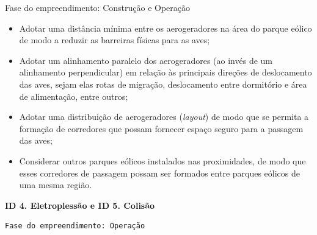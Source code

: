 \documentclass[
  oneside]{scrbook}
\providecommand{\tightlist}{%
  \setlength{\itemsep}{0pt}\setlength{\parskip}{0pt}}
\begin{document}
Fase do empreendimento: Construção e Operação

\begin{itemize}
\tightlist
\item
  Adotar uma distância mínima entre os aerogeradores na área do parque eólico de modo a reduzir as barreiras físicas para as aves;
\item
  Adotar um alinhamento paralelo dos aerogeradores (ao invés de um alinhamento perpendicular) em relação às principais direções de deslocamento das aves, sejam elas rotas de migração, deslocamento entre dormitório e área de alimentação, entre outros;
\item
  Adotar uma distribuição de aerogeradores (\emph{layout}) de modo que se permita a formação de corredores que possam fornecer espaço seguro para a passagem das aves;
\item
  Considerar outros parques eólicos instalados nas proximidades, de modo que esses corredores de passagem possam ser formados entre parques eólicos de uma mesma região.
\end{itemize}

\textbf{ID 4. Eletroplessão e ID 5. Colisão}

\begin{verbatim}
Fase do empreendimento: Operação  
\end{verbatim}
\end{document}
